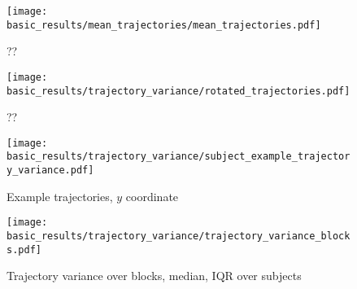 \documentclass[../main.tex]{subfiles}
\begin{document}
\begin{figure}[H]%
    \centering
    \texttt{[image: basic\_results/mean\_trajectories/mean\_trajectories.pdf]}
    \caption[Mean trajectories]{??}\label{fig:mean_trajectories}
\end{figure}


\begin{figure}[H]%
    \centering
    \texttt{[image: basic\_results/trajectory\_variance/rotated\_trajectories.pdf]}
    \caption[Rotating trajectories]{??}\label{fig:rotated_trajectories}
\end{figure}


\begin{figure}[H]%
    \centering
    \texttt{[image: basic\_results/trajectory\_variance/subject\_example\_trajectory\_variance.pdf]}
    \caption[Example trajectories, $y$ coordinate]{Example trajectories, $y$ coordinate}\label{fig:example_trajectories}
\end{figure}


\begin{figure}[H]%
    \centering
    \texttt{[image: basic\_results/trajectory\_variance/trajectory\_variance\_blocks.pdf]}
    \caption[Median and IQR of trajectory variance over blocks and subjects]{Trajectory variance over blocks, median, IQR over subjects}\label{fig:trajectory_variance}
\end{figure}







\end{document}
